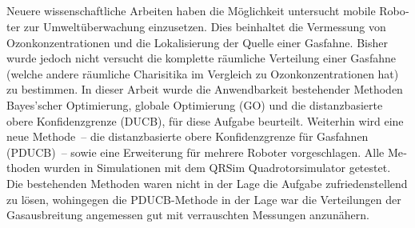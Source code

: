 \documentclass[11pt,a4paper,twoside,BCOR=15mm,listof=totoc,parskip=never]{scrbook}
\begin{document}
\begin{german}
\section*{\abstractname}
Neuere wissenschaftliche Arbeiten haben die Möglichkeit untersucht mobile 
Roboter zur Umweltüberwachung einzusetzen. Dies beinhaltet die Vermessung von 
Ozonkonzentrationen und die Lokalisierung der Quelle einer Gasfahne. Bisher 
wurde jedoch nicht versucht die komplette räumliche Verteilung einer Gasfahne 
(welche andere räumliche Charisitika im Vergleich zu Ozonkonzentrationen hat) zu 
bestimmen.  In dieser Arbeit wurde die Anwendbarkeit bestehender Methoden 
Bayes'scher Optimierung, globale Optimierung (GO) und die distanzbasierte obere 
Konfidenzgrenze (DUCB), für diese Aufgabe beurteilt.  Weiterhin wird eine neue 
Methode~-- die distanzbasierte obere Konfidenzgrenze für Gasfahnen (PDUCB)~-- 
sowie eine Erweiterung für mehrere Roboter vorgeschlagen.  Alle Methoden wurden 
in Simulationen mit dem QRSim Quadrotorsimulator getestet.  Die bestehenden 
Methoden waren nicht in der Lage die Aufgabe zufriedenstellend zu lösen, 
wohingegen die PDUCB-Methode in der Lage war die Verteilungen der Gasausbreitung 
angemessen gut mit verrauschten Messungen anzunähern.
\end{german}
\vspace*{\fill}

\tableofcontents


\printglossary[title={Symbols and Notation}]

\printglossary[type=\acronymtype]

\mainmatter{}









\appendix


\backmatter{}
\listoffigures{}
\listoftables{}
\printbibliography{}
\end{document}
